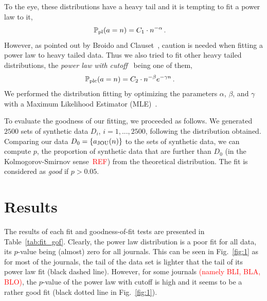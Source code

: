 \documentclass[aps,prl,floatfix,twocolumn]{revtex4-1}
\begin{document}
To the eye, these distributions have a heavy tail and it is tempting to fit a power law to it, 
\begin{align}\label{eq:pl}
 \mathbb{P}_{\rm pl}(a = n) &= C_1\cdot n^{-\alpha}\, .
\end{align}
However, as pointed out by Broido and Clauset~\cite{Bro18}, caution is needed when fitting a power law to heavy tailed data. 
Thus we also tried to fit other heavy tailed distributions, the \emph{power law with cutoff}~\cite{Bro18} being one of them, 
\begin{align}\label{eq:plco}
 \mathbb{P}_{\rm plc}(a = n) &= C_2\cdot n^{-\beta}e^{-\gamma n}\, .
\end{align} 
We performed the distribution fitting by optimizing the parameters $\alpha$, $\beta$, and $\gamma$ with a Maximum Likelihood Estimator (MLE)~\cite{Cla09}. 

To evaluate the goodness of our fitting, we proceeded as follows. 
We generated $2500$ sets of synthetic data $D_i$, $i=1,...,2500$, following the distribution obtained. 
Comparing our data $D_0=\{a_{\rm JOU}(n)\}$ to the sets of synthetic data, we can compute $p$, the proportion of synthetic data that are further than $D_0$ 
(in the Kolmogorov-Smirnov sense~\textcolor{red}{REF}) from the theoretical distribution. 
The fit is considered as \emph{good} if $p>0.05$. 


\section{Results}
The results of each fit and goodness-of-fit tests are presented in Table~\ref{tab:fit_gof}. 
Clearly, the power law distribution is a poor fit for all data, its $p$-value being (almost) zero for all journals. 
This can be seen in Fig.~\ref{fig:1} as for most of the journals, the tail of the data set is lighter that the tail of its power law fit (black dashed line). 
However, for some journals \textcolor{red}{(namely BLI, BLA, BLO)}, the $p$-value of the power law with cutoff is high and it seems to be a rather good fit (black dotted line in Fig.~\ref{fig:1}). 
\end{document}
